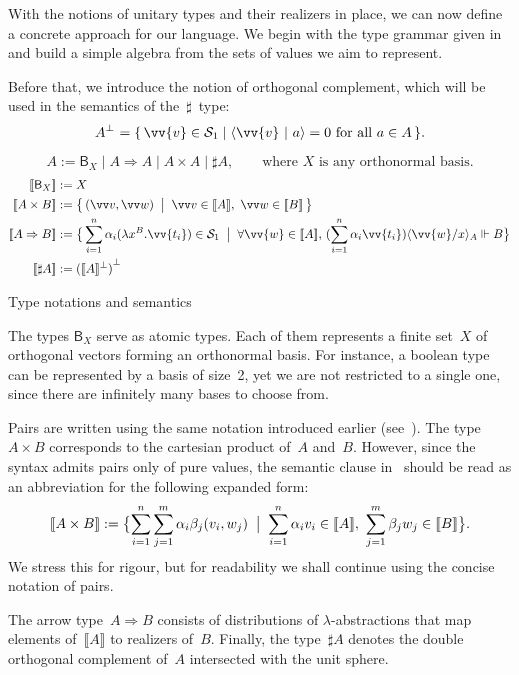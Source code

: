 \documentclass[runningheads,orivec,envcountsame,envcountsect]{llncs}
\newcommand\comp[2][]{#2^{\bot^{#1}}}
\newcommand\ansubst[2]{\ensuremath{\langle #1 \rangle_{#2}}}
\def\Sph{\mathcal{S}_1}       %
\def\scal#1#2{\langle{#1}~|~{#2}\rangle}
\def\Lam#1#2#3{\lambda#1^{#2}{.}#3} %
\def\Arr{\Rightarrow}
\def\sem#1{\llbracket#1\rrbracket}
\def\real{\Vdash}
\newcommand\basis[1]{\ensuremath{\mathsf{B}_{#1}}}
\begin{document}
With the notions of unitary types and their realizers in place, we can now
define a concrete approach for our language. We begin with the type grammar
given in~ and build a simple algebra from the sets of
values we aim to represent.

Before that, we introduce the notion of orthogonal complement, which will be
used in the semantics of the~$\sharp$~type:
\[
  \comp{A} = \{\, \vv{v}\in \Sph \mid \scal{\vv{v}}{a} = 0 \text{ for all } a\in A\,\}.
\]
\begin{table}[t]
  \[
    A := \basis{X} \mid A\Arr A \mid A\times A \mid \sharp A,
    \qquad\text{where $X$ is any orthonormal basis.}
  \]
  \begin{align*}
    \sem{\basis{X}}&:= X\\
    \sem{A\times B}&:= \bigl\{\,(\vv v, \vv w)\;\bigm|\; \vv v\in\sem{A},~\vv w\in\sem{B}\,\bigr\}\\
    \sem{A\Arr B}&:=
    \bigl\{\,\sum_{i=1}^{n}\alpha_i(\Lam{x}{B}{\vv{t_i}})\in\Sph
      \;\bigm|\;
      \forall\vv{w}\in\sem{A},\,
      (\sum_{i=1}^{n}\alpha_i \vv{t_i})\ansubst{\vv{w}/x}{A}\real B
    \bigr\}\\
    \sem{\sharp A}&:= {(\sem{A}^\bot)}^\bot
  \end{align*}
  \caption{Type notations and semantics}
  \label{tab:UnitaryTypes}
\end{table}

The types $\basis{X}$ serve as atomic types. Each of them represents a finite
set~$X$ of orthogonal vectors forming an orthonormal basis. For instance, a
boolean type can be represented by a basis of size~2, yet we are not restricted
to a single one, since there are infinitely many bases to choose from.

Pairs are written using the same notation introduced earlier
(see~).  The type~$A\times B$ corresponds to the
cartesian product of~$A$ and~$B$.  However, since the syntax admits pairs only
of pure values, the semantic clause in~ should be read
as an abbreviation for the following expanded form:
\[
  \sem{A\times B}
  := \bigl\{
       \sum_{i=1}^{n}\sum_{j=1}^{m}\alpha_i\beta_j(v_i,w_j)
       \;\bigm|\;
       \sum_{i=1}^{n}\alpha_i v_i\in\sem{A},~
       \sum_{j=1}^{m}\beta_j w_j\in\sem{B}
     \bigr\}.
\]
We stress this for rigour, but for readability we shall continue using the
concise notation of pairs.

The arrow type~$A\Arr B$ consists of distributions of $\lambda$-abstractions
that map elements of~$\sem{A}$ to realizers of~$B$.  
Finally, the type~$\sharp A$ denotes the double orthogonal complement of~$A$
intersected with the unit sphere.
\end{document}
